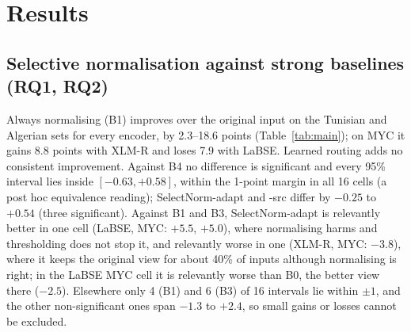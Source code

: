 \section{Results}
\label{sec:results}

\begin{table}[t]
\centering
\caption{Macro-F1 ($\lambda=0$, mean of five seeds), $f$ trained on Arabic script only. Bold: best deployable system per column; shaded: SelectNorm-adapt (primary). $^{\triangledown}$/$^{\blacktriangle}$: B0, B1, B3, B4 or SelectNorm-src significantly worse/better than SelectNorm-adapt (paired bootstrap, Holm-corrected $p<0.05$, 20 comparisons per encoder). $^\dagger$Two passes; $^\ddagger$uses test labels.}
\label{tab:main}
\footnotesize\setlength{\tabcolsep}{3.2pt}

\end{table}

\subsection{Selective normalisation against strong baselines (RQ1, RQ2)}
\label{sec:main-results}
Always normalising (B1) improves over the original input on the Tunisian and Algerian sets for every encoder, by 2.3--18.6 points (Table~\ref{tab:main}); on MYC it gains 8.8 points with XLM-R and loses 7.9 with LaBSE. Learned routing adds no consistent improvement. Against B4 no difference is significant and every 95\% interval lies inside $[-0.63,+0.58]$, within the 1-point margin in all 16 cells (a post hoc equivalence reading); SelectNorm-adapt and -src differ by $-0.25$ to $+0.54$ (three significant). Against B1 and B3, SelectNorm-adapt is relevantly better in one cell (LaBSE, MYC: $+5.5$, $+5.0$), where normalising harms and thresholding does not stop it, and relevantly worse in one (XLM-R, MYC: $-3.8$), where it keeps the original view for about 40\% of inputs although normalising is right; in the LaBSE MYC cell it is relevantly worse than B0, the better view there ($-2.5$). Elsewhere only 4 (B1) and 6 (B3) of 16 intervals lie within $\pm1$, and the other non-significant ones span $-1.3$ to $+2.4$, so small gains or losses cannot be excluded.

